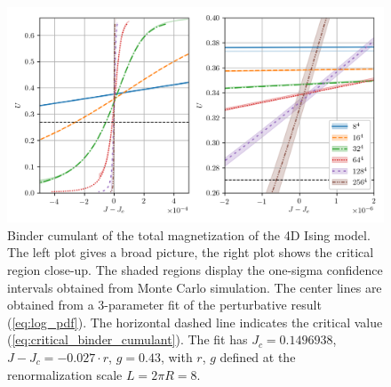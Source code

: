 \documentclass[11pt,a4paper]{article}
\begin{document}
\begin{figure}
\begin{center}
\includegraphics[scale=0.75]{binder_cumulant.png}
\end{center}
    \caption{\label{fig:binder_cumulant} Binder cumulant of the total
    magnetization of the 4D Ising model. The left plot gives a broad picture,
    the right plot shows the critical region close-up.  The shaded regions
    display the one-sigma confidence intervals obtained from Monte Carlo
    simulation. The center lines are obtained from a 3-parameter fit of the
    perturbative result (\ref{eq:log_pdf}). The horizontal dashed line
    indicates the critical value (\ref{eq:critical_binder_cumulant}). The fit
    has $J_c = 0.1496938$, $J - J_c = -0.027\cdot r$, $g = 0.43$, with $r$, $g$
    defined at the renormalization scale $L = 2\pi R = 8$. }
\end{figure}
\end{document}

